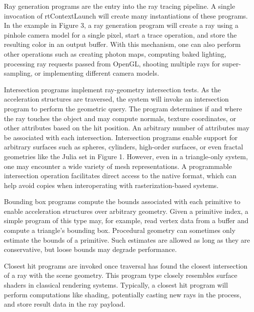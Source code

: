 Ray generation programs are the entry into the ray tracing pipeline.
A single invocation of rtContextLaunch will create many instantiations of these programs. In the example in Figure 3, a ray generation program will create a ray using a pinhole camera model for
a single pixel, start a trace operation, and store the resulting color
in an output buffer. With this mechanism, one can also perform
other operations such as creating photon maps, computing baked
lighting, processing ray requests passed from OpenGL, shooting
multiple rays for super-sampling, or implementing different camera models.

Intersection programs implement ray-geometry intersection tests.
As the acceleration structures are traversed, the system will invoke
an intersection program to perform the geometric query. The program determines if and where the ray touches the object and may
compute normals, texture coordinates, or other attributes based on
the hit position. An arbitrary number of attributes may be associated with each intersection. Intersection programs enable support for arbitrary surfaces such as spheres, cylinders, high-order
surfaces, or even fractal geometries like the Julia set in Figure 1.
However, even in a triangle-only system, one may encounter a wide
variety of mesh representations. A programmable intersection operation facilitates direct access to the native format, which can help
avoid copies when interoperating with rasterization-based systems.

Bounding box programs compute the bounds associated with each
primitive to enable acceleration structures over arbitrary geometry.
Given a primitive index, a simple program of this type may, for
example, read vertex data from a buffer and compute a triangle’s
bounding box. Procedural geometry can sometimes only estimate
the bounds of a primitive. Such estimates are allowed as long as
they are conservative, but loose bounds may degrade performance.

Closest hit programs are invoked once traversal has found the closest intersection of a ray with the scene geometry. This program
type closely resembles surface shaders in classical rendering systems. Typically, a closest hit program will perform computations
like shading, potentially casting new rays in the process, and store
result data in the ray payload.

